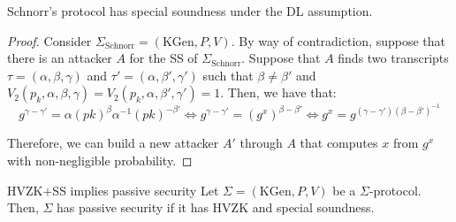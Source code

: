 \documentclass[a4paper, 12pt]{report}
\begin{document}
    \begin{framedprop}{}
        Schnorr's protocol has special soundness under the DL assumption.
    \end{framedprop}

    \begin{proof}
        Consider $\Sigma_{\text{Schnorr}} = (\mathrm{KGen}, P, V)$. By way of contradiction, suppose that there is an attacker $A$ for the SS of $\Sigma_{\text{Schnorr}}$. Suppose that $A$ finds two transcripts $\tau = (\alpha, \beta, \gamma)$ and $\tau' = (\alpha, \beta', \gamma')$ such that $\beta \neq \beta'$ and $V_2(p_k, \alpha, \beta, \gamma) = V_2(p_k, \alpha, \beta', \gamma') = 1$. Then, we have that:
        \[g^{\gamma-\gamma'} = \alpha(pk)^{\beta} \alpha^{-1} (pk)^{-\beta'} \iff g^{\gamma-\gamma'} = (g^x)^{\beta - \beta'} \iff g^x = g^{(\gamma-\gamma')(\beta-\beta')^{-1}}\]

        Therefore, we can build a new attacker $A'$ through $A$ that computes $x$ from $g^x$ with non-negligible probability.
    \end{proof}

    \begin{framedthm}{HVZK$+$SS implies passive security}
        Let $\Sigma = (\mathrm{KGen}, P, V)$ be a $\Sigma$-protocol. Then, $\Sigma$ has passive security if it has HVZK and special soundness.
    \end{framedthm}
\end{document}
